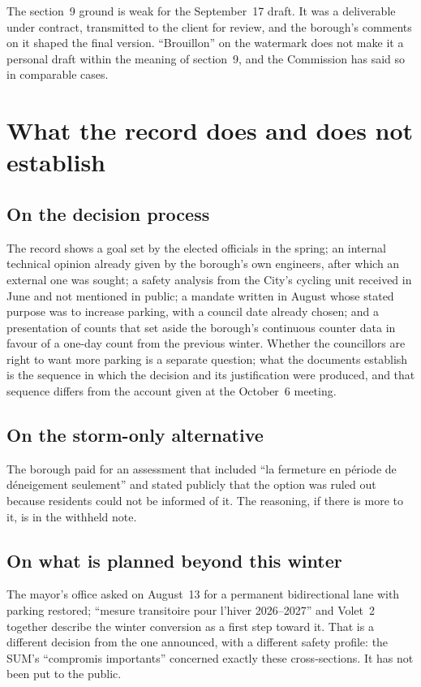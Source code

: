 \documentclass[11pt,letterpaper]{article}
\begin{document}
The section~9 ground is weak for the September~17 draft. It was a
deliverable under contract, transmitted to the client for review, and the
borough's comments on it shaped the final version. ``Brouillon'' on the
watermark does not make it a personal draft within the meaning of
section~9, and the Commission has said so in comparable cases.

\section{What the record does and does not establish}

\subsection{On the decision process}

The record shows a goal set by the elected officials in the spring; an
internal technical opinion already given by the borough's own engineers,
after which an external one was sought; a safety analysis from the City's
cycling unit received in June and not mentioned in public; a mandate written
in August whose stated purpose was to increase parking, with a council date
already chosen; and a presentation of counts that set aside the borough's
continuous counter data in favour of a one-day count from the previous
winter. Whether the councillors are right to want more parking is a
separate question; what the documents establish is the sequence in which
the decision and its justification were produced, and that sequence differs
from the account given at the October~6 meeting.

\subsection{On the storm-only alternative}

The borough paid for an assessment that included ``la fermeture en
p\'eriode de d\'eneigement seulement'' and stated publicly that the option was
ruled out because residents could not be informed of it. The reasoning, if
there is more to it, is in the withheld note.

\subsection{On what is planned beyond this winter}

The mayor's office asked on August~13 for a permanent bidirectional lane
with parking restored; ``mesure transitoire pour l'hiver 2026--2027'' and
Volet~2 together describe the winter conversion as a first step toward it. That is
a different decision from the one announced, with a different safety
profile: the SUM's ``compromis importants'' concerned exactly these
cross-sections. It has not been put to the public.
\end{document}
